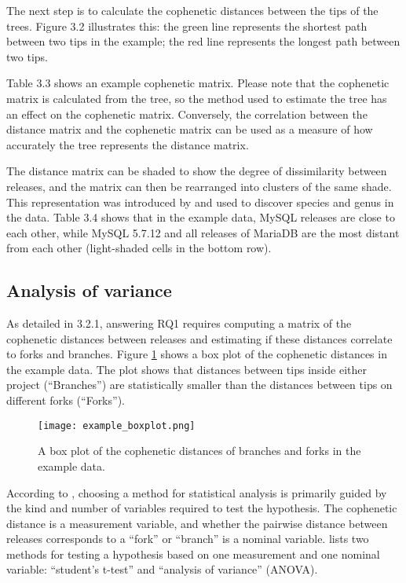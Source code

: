 The next step is to calculate the cophenetic distances between the tips of the trees. Figure 3.2 illustrates this: the green line represents the shortest path between two tips in the example; the red line represents the longest path between two tips.

Table 3.3 shows an example cophenetic matrix. Please note that the cophenetic matrix is calculated from the tree, so the method used to estimate the tree has an effect on the cophenetic matrix. Conversely, the correlation between the distance matrix and the cophenetic matrix can be used as a measure of how accurately the tree represents the distance matrix.

The distance matrix can be shaded to show the degree of dissimilarity between releases, and the matrix can then be rearranged into clusters of the same shade. This representation was introduced by \citet{Sneath1962a} and used to discover species and genus in the data. Table 3.4 shows that in the example data, MySQL releases are close to each other, while MySQL 5.7.12 and all releases of MariaDB are the most distant from each other (light-shaded cells in the bottom row).

\subsection{Analysis of variance}
As detailed in 3.2.1, answering RQ1 requires computing a matrix of the cophenetic distances between releases and estimating if these distances correlate to forks and branches. Figure \ref{fig:example_boxplot} shows a box plot of the cophenetic distances in the example data. The plot shows that distances between tips inside either project (“Branches”) are statistically smaller than the distances between tips on different forks (“Forks”).

\begin{figure}[H]
  \centering
  \texttt{[image: example\_boxplot.png]}
  \caption{A box plot of the cophenetic distances of branches and forks in the example data.}
  \label{fig:example_boxplot}
\end{figure}

According to \citet{McDonald2014b}, choosing a method for statistical analysis is primarily guided by the kind and number of variables required to test the hypothesis. The cophenetic distance is a measurement variable, and whether the pairwise distance between releases corresponds to a “fork” or “branch” is a nominal variable. \citet{McDonald2014b} lists two methods for testing a hypothesis based on one measurement and one nominal variable: “student's t-test” and “analysis of variance” (ANOVA).

